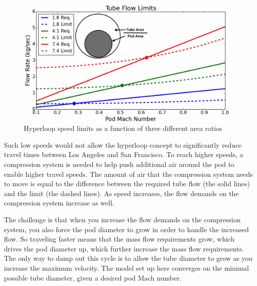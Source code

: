 \documentclass[heading.tex]{subfiles}
\begin{document}
\begin{figure}[hbtp]
\centering
\includegraphics[width=\textwidth]{images/tube_flow_limit3.png}
\caption{Hyperloop speed limits as a function of three different area ratios}
\label{f:flowLIMIT}
\end{figure}

Such low speeds would not allow the hyperloop concept to significantly reduce travel times between Los Angeles and San Francisco. To
reach higher speeds, a compression system is needed to help push additional air around the pod to enable higher travel speeds. The amount
of air that the compression system needs to move is equal to the difference between the required tube flow (the solid lines) and the limit
(the dashed lines). As speed increases, the flow demands on the compression system increase as well.

The challenge is that when you increase the flow demands on the compression system, you also force the pod diameter to grow in order to
handle the increased flow. So traveling faster means that the mass flow requirements grow, which drives the pod diameter up, which further
increase the mass flow requirements. The only way to damp out this cycle is to allow the tube diameter to grow as you increase the
maximum velocity. The model set up here converges on the minimal possible tube diameter, given a desired pod Mach number.
\end{document}
